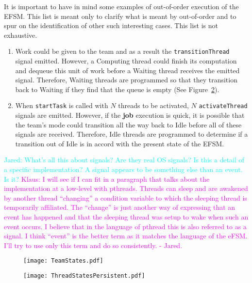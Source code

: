 \documentclass{article}
\newcommand{\Jared}[1]          {\textcolor{cyan}{Jared: #1}}
\newcommand{\KlausRfromJO}[1]   {\textcolor{magenta}{Klaus: #1 - Jared.}}
\newcommand{\taskroutine}        {task routine\xspace}
\newcommand{\job}                {\textbf{job}\xspace}  %
\begin{document}
It is important to have in mind some examples of out-of-order execution of the
EFSM.  This list is meant only to clarify what is meant by out-of-order and to
spur on the identification of other such interesting cases.  This list is
not exhaustive.
\begin{enumerate}
\item{Work could be given to the team and as a result the
\texttt{transitionThread} signal emitted.  However, a Computing thread could
finish its computation and dequeue this unit of work before a Waiting thread
receives the emitted signal.  Therefore, Waiting threads are programmed so that
they transition back to Waiting if they find that the queue is empty (See
Figure~\ref{fig:ThreadStateDiagram}).}
\item{When \texttt{startTask} is called with $N$ threads to be activated, $N$
\texttt{activateThread} signals are emitted.  However, if the \job execution is
quick, it is possible that the team's mode could transition all the way back to
Idle before all of these signals are received.  Therefore, Idle threads are
programmed to determine if a transition out of Idle is in accord with the
present state of the EFSM.}
\end{enumerate}
\Jared{What's all this about signals? Are they real OS signals?
Is this a detail of a specific implementation?
A signal appears to be something else than an event. Is it?}  \KlausRfromJO{I
will see if I can fit in a paragraph that talks about the implementation at a
low-level with pthreads.  Threads can sleep and are awakened by another thread
``changing'' a condition variable to which the sleeping thread is temporarily
affiliated.  The ``change'' is just another way of expressing that an event
has happened and that the sleeping thread was setup to wake when such an event
occurs.  I believe that in the language of pthread this is also referred to as a
signal.  I think ``event'' is the better term as it matches the language of the
eFSM.  I'll try to use only this term and do so consistently.}

\begin{figure}[!ht]
\begin{center}
\texttt{[image: TeamStates.pdf]}
\caption[]{}
\label{fig:TeamStateDiagram}
\end{center}
\end{figure}

\begin{figure}[!hp]
\begin{center}
\texttt{[image: ThreadStatesPersistent.pdf]}
\caption[]{}
\label{fig:ThreadStateDiagram}
\end{center}
\end{figure}
\end{document}
